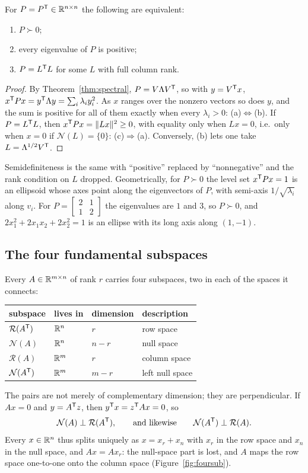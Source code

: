 \documentclass[11pt]{article}
\begin{document}
\begin{proposition}\label{prop:pdtests}
For $P=P^{\mathsf{T}}\in\mathbb{R}^{n\times n}$ the following are equivalent:
\begin{enumerate}[label=(\alph*),itemsep=2pt]
\item $P\succ0$;
\item every eigenvalue of $P$ is positive;
\item $P=L^{\mathsf{T}} L$ for some $L$ with full column rank.
\end{enumerate}
\end{proposition}
\begin{proof}
By Theorem~\ref{thm:spectral}, $P=V\Lambda V^{\mathsf{T}}$, so with $y=V^{\mathsf{T}} x$,
$x^{\mathsf{T}} Px=y^{\mathsf{T}}\Lambda y=\sum_i\lambda_iy_i^{2}$. As $x$ ranges over the nonzero
vectors so does $y$, and the sum is positive for all of them exactly when every
$\lambda_i>0$: (a)$\Leftrightarrow$(b). If $P=L^{\mathsf{T}} L$, then $x^{\mathsf{T}} Px=\|Lx\|^{2}\ge0$,
with equality only when $Lx=0$, i.e.\ only when $x=0$ if $\mathcal N(L)=\{0\}$:
(c)$\Rightarrow$(a). Conversely, (b) lets one take $L=\Lambda^{1/2}V^{\mathsf{T}}$.
\end{proof}
Semidefiniteness is the same with ``positive'' replaced by ``nonnegative'' and
the rank condition on $L$ dropped. Geometrically, for $P\succ0$ the level set
$x^{\mathsf{T}} Px=1$ is an ellipsoid whose axes point along the eigenvectors of $P$, with
semi-axis $1/\sqrt{\lambda_i}$ along $v_i$. For $P=\begin{bmatrix}2&1\\1&2\end{bmatrix}$
the eigenvalues are $1$ and $3$, so $P\succ0$, and $2x_1^{2}+2x_1x_2+2x_2^{2}=1$ is
an ellipse with its long axis along $(1,-1)$.

\subsection{The four fundamental subspaces}\label{sec:foursub}
Every $A\in\mathbb{R}^{m\times n}$ of rank $r$ carries four subspaces, two in each of the
spaces it connects:
\begin{center}\small
\renewcommand{\arraystretch}{1.3}
\begin{tabular}{@{}llll@{}}
\toprule
subspace & lives in & dimension & description\\
\midrule
$\mathcal R(A^{\mathsf{T}})$ & $\mathbb{R}^{n}$ & $r$   & row space\\
$\mathcal N(A)$    & $\mathbb{R}^{n}$ & $n-r$ & null space\\
$\mathcal R(A)$    & $\mathbb{R}^{m}$ & $r$   & column space\\
$\mathcal N(A^{\mathsf{T}})$ & $\mathbb{R}^{m}$ & $m-r$ & left null space\\
\bottomrule
\end{tabular}
\end{center}
The pairs are not merely of complementary dimension; they are perpendicular. If
$Ax=0$ and $y=A^{\mathsf{T}} z$, then $y^{\mathsf{T}} x=z^{\mathsf{T}} Ax=0$, so
\[
   \mathcal N(A)\perp\mathcal R(A^{\mathsf{T}}),\qquad\text{and likewise}\qquad
   \mathcal N(A^{\mathsf{T}})\perp\mathcal R(A).
\]
Every $x\in\mathbb{R}^{n}$ thus splits uniquely as $x=x_r+x_n$ with $x_r$ in the row space
and $x_n$ in the null space, and $Ax=Ax_r$: the null-space part is lost, and $A$
maps the row space one-to-one onto the column space (Figure~\ref{fig:foursub}).
\end{document}
